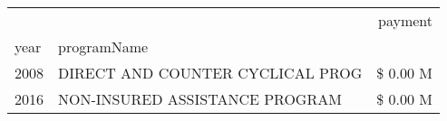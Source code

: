 \begin{tabular}{llr}
\toprule
 &  & payment \\
year & programName &  \\
\midrule
2008 & DIRECT AND COUNTER CYCLICAL PROG & \$ 0.00 M \\
\cline{1-3}
2016 & NON-INSURED ASSISTANCE PROGRAM & \$ 0.00 M \\
\cline{1-3}
\bottomrule
\end{tabular}
